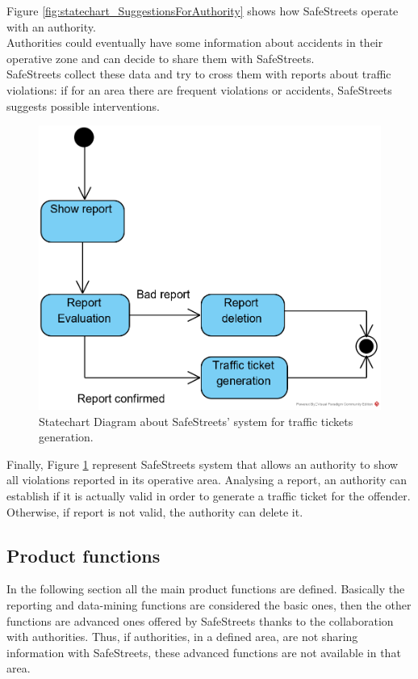 \documentclass{article}
\begin{document}
	Figure \ref{fig:statechart_SuggestionsForAuthority} shows how SafeStreets operate with an authority.\\
	Authorities could eventually have some information about accidents in their operative zone and can decide to share them with SafeStreets.\\
	SafeStreets collect these data and try to cross them with reports about traffic violations: if for an area there are frequent violations or accidents, SafeStreets suggests possible interventions.
	
	\begin{figure}[H]
		\centering
		\includegraphics {diagrams/statechart_trafficTicket.png}
		\caption[Statechart Diagram3]{Statechart Diagram about SafeStreets' system for traffic tickets generation.}
		\label{fig:statechart_trafficTickets}
	\end{figure}
	
	Finally, Figure \ref{fig:statechart_trafficTickets} represent SafeStreets system that allows an authority to show all violations reported in its operative area. Analysing a report, an authority can establish if it is actually valid in order to generate a traffic ticket for the offender. Otherwise, if report is not valid, the authority can delete it.
	
	\clearpage	   
	
	\subsection{Product functions}
	In the following section all the main product functions are defined. Basically the reporting and data-mining functions are considered the basic ones, then the other functions are advanced ones offered by SafeStreets thanks to the collaboration with authorities. Thus, if authorities, in a defined area, are not sharing information with SafeStreets, these advanced functions are not available in that area.
\end{document}
